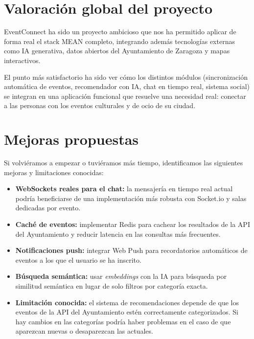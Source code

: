 \documentclass[12pt, a4paper]{article}
\begin{document}
\section{Valoración global del proyecto}

EventConnect ha sido un proyecto ambicioso que nos ha permitido aplicar de forma real
el stack MEAN completo, integrando además tecnologías externas como IA generativa, datos
abiertos del Ayuntamiento de Zaragoza y mapas interactivos.

El punto más satisfactorio ha sido ver cómo los distintos módulos (sincronización
automática de eventos, recomendador con IA, chat en tiempo real, sistema social) se
integran en una aplicación funcional
que resuelve una necesidad real: conectar a las personas con los eventos culturales y
de ocio de su ciudad.



\section{Mejoras propuestas}

Si volviéramos a empezar o tuviéramos más tiempo, identificamos las siguientes
mejoras y limitaciones conocidas:

\begin{itemize}[leftmargin=1.4em]
  \item \textbf{WebSockets reales para el chat:} la mensajería en tiempo real actual
    podría beneficiarse de una implementación más robusta con Socket.io y salas
    dedicadas por evento.
  \item \textbf{Caché de eventos:} implementar Redis para cachear los resultados de la
    API del Ayuntamiento y reducir latencia en las consultas más frecuentes.
  \item \textbf{Notificaciones push:} integrar Web Push para recordatorios automáticos
    de eventos a los que el usuario se ha inscrito.
  \item \textbf{Búsqueda semántica:} usar \textit{embeddings} con la IA para búsqueda
    por similitud semántica en lugar de solo filtros por categoría exacta.
  \item \textbf{Limitación conocida:} el sistema de recomendaciones depende de que los
    eventos de la API del Ayuntamiento estén correctamente categorizados. Si hay cambios en las categorías podría haber problemas en el caso de que aparezcan nuevas o desaparezcan las actuales.
\end{itemize}
\end{document}
